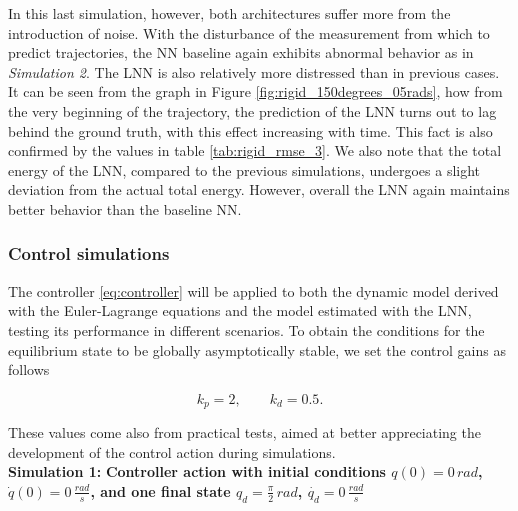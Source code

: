 \documentclass[a4paper]{article}
\begin{document}
In this last simulation, however, both architectures suffer more from the introduction of noise. With the disturbance of the measurement from which to predict trajectories, the NN baseline again exhibits abnormal behavior as in \textit{Simulation 2}. The LNN is also relatively more distressed than in previous cases. It can be seen from the graph in Figure \ref{fig:rigid_150degrees_05rads}, how from the very beginning of the trajectory, the prediction of the LNN turns out to lag behind the ground truth, with this effect increasing with time. This fact is also confirmed by the values in table \ref{tab:rigid_rmse_3}. We also note that the total energy of the LNN, compared to the previous simulations, undergoes a slight deviation from the actual total energy. However, overall the LNN again maintains better behavior than the baseline NN.

\subsubsection{Control simulations}
The controller \eqref{eq:controller} will be applied to both the dynamic model derived with the Euler-Lagrange equations and the model estimated with the LNN, testing its performance in different scenarios. To obtain the conditions for the equilibrium state to be globally asymptotically stable, we set the control gains as follows

\begin{equation}
    \nonumber
    k_p = 2, \qquad k_d = 0.5.
\end{equation}

These values come also from practical tests, aimed at better appreciating the development of the control action during simulations.\\

\textbf{Simulation 1:} \textbf{Controller action with initial conditions $q(0)=0\, rad$,  $\dot{q}(0)=0\, \frac{rad}{s}$, and one final state $q_d=\frac{\pi}{2} \, rad$,  $\dot{q_d}=0 \, \frac{rad}{s}$}
\end{document}
